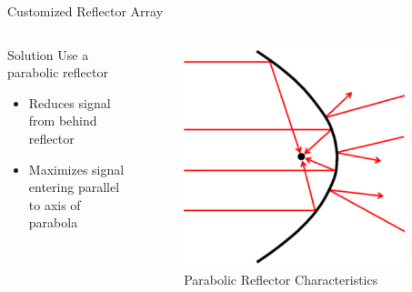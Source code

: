 \documentclass{beamer}
\begin{document}
\begin{frame}{Customized Reflector Array}
  \begin{columns}
      \begin{block}{Solution}
        Use a parabolic reflector
        \begin{itemize}
          \item Reduces signal from behind reflector
          \item Maximizes signal entering parallel to axis of parabola
        \end{itemize}
      \end{block}
      \begin{figure}
        \centering
        \includegraphics[width=0.9\textwidth]{figs/img/parabolicReflectorDiagram.png}
        \caption{Parabolic Reflector Characteristics}
        \label{fig:parabolicReflectorDiagram}
      \end{figure}
  \end{columns}
\end{frame}
\end{document}

